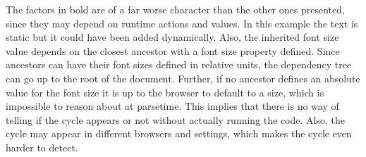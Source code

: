 \documentclass[a4paper,11pt]{kth-mag}
\newcommand{\code}[1]{\texttt{#1}}
\begin{document}
          The factors in bold are of a far worse character than the other ones presented, since they may depend on runtime actions and values.
          In this example the text is static but it could have been added dynamically.
          Also, the inherited font size value depends on the closest ancestor with a font size property defined.
          Since ancestors can have their font sizes defined in relative units, the dependency tree can go up to the root of the \gls{document}.
          Further, if no ancestor defines an absolute value for the font size it is up to the \gls{browser} to default to a size, which is impossible to reason about at parsetime.
          This implies that there is no way of telling if the cycle appears or not without actually running the code.
          Also, the cycle may appear in different \glspl{browser} and settings, which makes the cycle even harder to detect.
          
\end{document}
